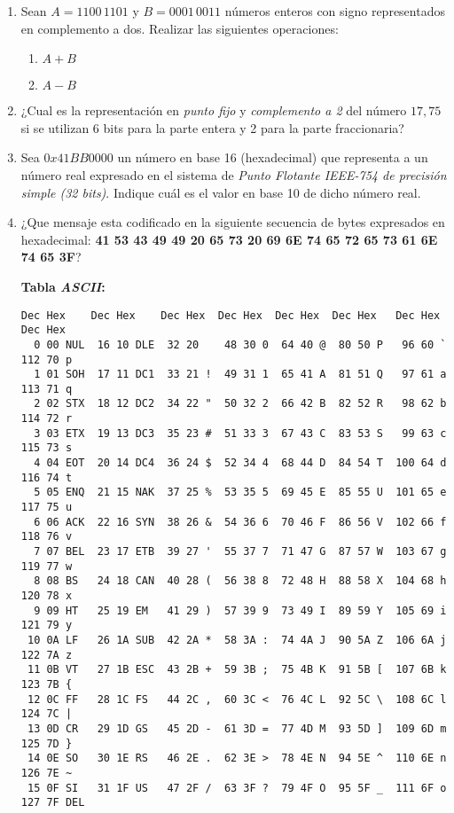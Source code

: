 \documentclass[12pt]{article}
\begin{document}
\begin{enumerate}

    \item Sean $A=1100\,1101$ y $B=0001\,0011$ números enteros con signo
        representados en complemento a dos. Realizar las siguientes
        operaciones:

        \begin{enumerate}

            \item $A+B$

            \item $A-B$

        \end{enumerate}

    \item ¿Cual es la representación en \emph{punto fijo} y \emph{complemento
        a 2} del número $17,75$ si se utilizan 6 bits para la parte entera y 2
        para la parte fraccionaria?

    \item Sea $0x41BB0000$ un número en base 16 (hexadecimal) que representa a
        un número real expresado en el sistema de \emph{Punto Flotante
        IEEE-754 de precisión simple (32 bits)}. Indique cuál es el valor en
        base 10 de dicho número real.

    \item ¿Que mensaje esta codificado en la siguiente secuencia de bytes
        expresados en hexadecimal: \textbf{41 53 43 49 49 20 65 73  20 69 6E
        74 65 72 65 73 61 6E 74 65 3F}?

\textbf{Tabla \emph{ASCII}:}

\begin{verbatim}
Dec Hex    Dec Hex    Dec Hex  Dec Hex  Dec Hex  Dec Hex   Dec Hex   Dec Hex
  0 00 NUL  16 10 DLE  32 20    48 30 0  64 40 @  80 50 P   96 60 `  112 70 p
  1 01 SOH  17 11 DC1  33 21 !  49 31 1  65 41 A  81 51 Q   97 61 a  113 71 q
  2 02 STX  18 12 DC2  34 22 "  50 32 2  66 42 B  82 52 R   98 62 b  114 72 r
  3 03 ETX  19 13 DC3  35 23 #  51 33 3  67 43 C  83 53 S   99 63 c  115 73 s
  4 04 EOT  20 14 DC4  36 24 $  52 34 4  68 44 D  84 54 T  100 64 d  116 74 t
  5 05 ENQ  21 15 NAK  37 25 %  53 35 5  69 45 E  85 55 U  101 65 e  117 75 u
  6 06 ACK  22 16 SYN  38 26 &  54 36 6  70 46 F  86 56 V  102 66 f  118 76 v
  7 07 BEL  23 17 ETB  39 27 '  55 37 7  71 47 G  87 57 W  103 67 g  119 77 w
  8 08 BS   24 18 CAN  40 28 (  56 38 8  72 48 H  88 58 X  104 68 h  120 78 x
  9 09 HT   25 19 EM   41 29 )  57 39 9  73 49 I  89 59 Y  105 69 i  121 79 y
 10 0A LF   26 1A SUB  42 2A *  58 3A :  74 4A J  90 5A Z  106 6A j  122 7A z
 11 0B VT   27 1B ESC  43 2B +  59 3B ;  75 4B K  91 5B [  107 6B k  123 7B {
 12 0C FF   28 1C FS   44 2C ,  60 3C <  76 4C L  92 5C \  108 6C l  124 7C |
 13 0D CR   29 1D GS   45 2D -  61 3D =  77 4D M  93 5D ]  109 6D m  125 7D }
 14 0E SO   30 1E RS   46 2E .  62 3E >  78 4E N  94 5E ^  110 6E n  126 7E ~
 15 0F SI   31 1F US   47 2F /  63 3F ?  79 4F O  95 5F _  111 6F o  127 7F DEL
\end{verbatim}


\end{enumerate}
\end{document}

